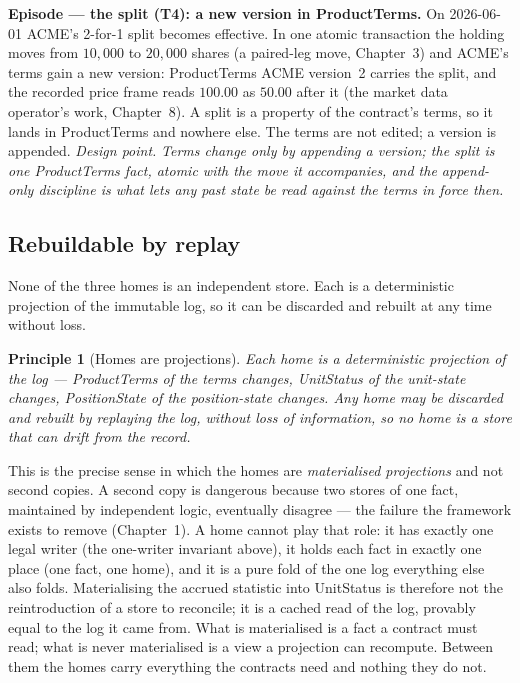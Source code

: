 \documentclass[11pt,a4paper]{article}
\newtheorem{principle}[definition]{Principle}
\begin{document}
\medskip\noindent\textbf{Episode --- the split (T4): a new version in ProductTerms.}
On 2026-06-01 ACME's 2-for-1 split becomes effective. In one atomic transaction the holding
moves from $10{,}000$ to $20{,}000$ shares (a paired-leg move, Chapter~3) and
ACME's terms gain a new version: ProductTerms ACME version~2 carries the split, and the
recorded price frame reads $100.00$ as $50.00$ after it (the market data operator's work,
Chapter~8). A split is a property of the contract's terms, so
it lands in ProductTerms and nowhere else. The terms are not edited; a version is appended.
\emph{Design point.} \emph{Terms change only by appending a version; the split is one
ProductTerms fact, atomic with the move it accompanies, and the append-only discipline is
what lets any past state be read against the terms in force then.}

\subsection{Rebuildable by replay}

None of the three homes is an independent store. Each is a deterministic projection of the
immutable log, so it can be discarded and rebuilt at any time without loss.

\begin{principle}[Homes are projections]\label{prin:rebuildable}
Each home is a deterministic projection of the log --- ProductTerms of the terms changes,
UnitStatus of the unit-state changes, PositionState of the position-state changes. Any
home may be discarded and rebuilt by replaying the log, without loss of information, so no
home is a store that can drift from the record.
\end{principle}

This is the precise sense in which the homes are \emph{materialised projections} and not
second copies. A second copy is dangerous because two stores of one fact, maintained by
independent logic, eventually disagree --- the failure the framework exists to remove
(Chapter~1). A home cannot play that role: it has exactly one legal
writer (the one-writer invariant above), it holds each fact in exactly one place
(one fact, one home), and it is a pure fold of the one log everything else also
folds. Materialising the accrued statistic into UnitStatus is therefore not the
reintroduction of a store to reconcile; it is a cached read of the log, provably equal to
the log it came from. What is materialised is a fact a contract must read; what is never
materialised is a view a projection can recompute. Between them the homes carry everything
the contracts need and nothing they do not.
\end{document}
